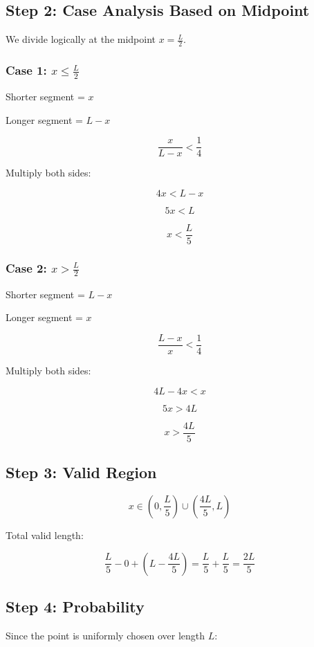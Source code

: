 \documentclass[12pt]{article}
\begin{document}
\subsection*{Step 2: Case Analysis Based on Midpoint}

We divide logically at the midpoint $x = \frac{L}{2}$.

\subsubsection*{Case 1: $x \le \frac{L}{2}$}

Shorter segment = $x$

Longer segment = $L-x$

\[
\frac{x}{L-x} < \frac{1}{4}
\]

Multiply both sides:

\[
4x < L - x
\]

\[
5x < L
\]

\[
x < \frac{L}{5}
\]

\subsubsection*{Case 2: $x > \frac{L}{2}$}

Shorter segment = $L - x$

Longer segment = $x$

\[
\frac{L-x}{x} < \frac{1}{4}
\]

Multiply both sides:

\[
4L - 4x < x
\]

\[
5x > 4L
\]

\[
x > \frac{4L}{5}
\]

\subsection*{Step 3: Valid Region}

\[
x \in \left(0, \frac{L}{5}\right) \cup \left(\frac{4L}{5}, L\right)
\]

Total valid length:

\[
\frac{L}{5} - 0 + \left(L - \frac{4L}{5}\right)
= \frac{L}{5} + \frac{L}{5}
= \frac{2L}{5}
\]

\subsection*{Step 4: Probability}

Since the point is uniformly chosen over length $L$:
\end{document}
